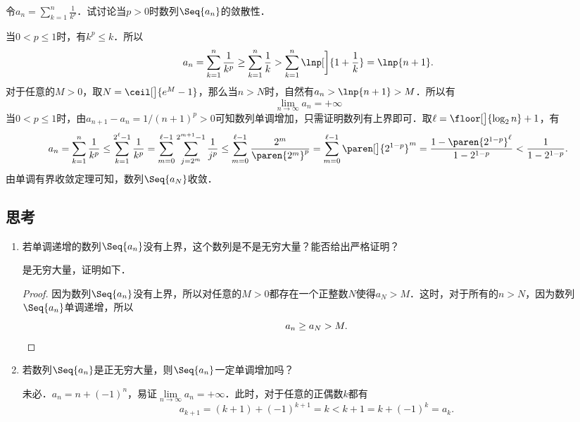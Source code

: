 \begin{example*}
  令\(\displaystyle a_n = \sum_{k=1}^n \frac1{k^p}\)．试讨论当\(p > 0\)时数列\(\Seq{a_n}\)的敛散性．

  \begin{remark}
    当\(0 < p \le 1\)时，有\(k^p \le k\)．所以
    \begin{equation*}
      a_n = \sum_{k=1}^n \frac1{k^p} \ge \sum_{k=1}^n \frac1{k}
      > \sum_{k=1}^n \lnp[\bigg]{1+\frac1k} = \lnp{n+1}.
    \end{equation*}
    对于任意的\(M > 0\)，取\(N = \ceil[\big]{e^M - 1}\)，那么当\(n > N\)时，自然有\(a_n > \lnp{n+1} > M\)．所以有
    \begin{equation*}
      \lim_{n\to\infty} a_n = +\infty
    \end{equation*}
    当\(0 < p \le 1\)时，由\(a_{n+1} - a_n = 1/(n+1)^p > 0\)可知数列单调增加，只需证明数列有上界即可．取\(\ell = \floor[\big]{\log_2 n} + 1\)，有
    \begin{equation*}
      a_n
      = \sum_{k=1}^n \frac1{k^p}
      \le \sum_{k=1}^{2^\ell-1} \frac1{k^p}
      = \sum_{m=0}^{\ell-1} \sum_{j=2^m}^{2^{m+1}-1} \frac{1}{j^p}
      \le \sum_{m=0}^{\ell-1} \frac{2^m}{\paren{2^m}^p}
      = \sum_{m=0}^{\ell-1} \paren[\big]{2^{1-p}}^m
      = \frac{1-\paren{2^{1-p}}^\ell}{1-2^{1-p}}
      < \frac{1}{1-2^{1-p}}.
    \end{equation*}
    由单调有界收敛定理可知，数列\(\Seq{a_N}\)收敛．
  \end{remark}
\end{example*}

\subsection*{思考}

\begin{enumerate}
\item 若单调递增的数列\(\Seq{a_n}\)没有上界，这个数列是不是无穷大量？能否给出严格证明？

  \ifshowsolp
  是无穷大量，证明如下．

  \begin{proof}
    因为数列\(\Seq{a_n}\)没有上界，所以对任意的\(M > 0\)都存在一个正整数\(N\)使得\(a_N > M\)．这时，对于所有的\(n > N\)，因为数列\(\Seq{a_n}\)单调递增，所以
    \begin{equation*}
      a_n \ge a_N > M. \qedhere
    \end{equation*}
  \end{proof}
  \fi

\item 若数列\(\Seq{a_n}\)是正无穷大量，则\(\Seq{a_n}\)一定单调增加吗？

  \ifshowsolp
  未必．\(a_n = n + (-1)^n\)，易证\(\lim\limits_{n\to\infty} a_n = +\infty\)．此时，对于任意的正偶数\(k\)都有
  \begin{equation*}
    a_{k+1} = (k+1) + (-1)^{k+1} = k < k + 1 = k + (-1)^k = a_k.
  \end{equation*}
  \fi
\end{enumerate}

